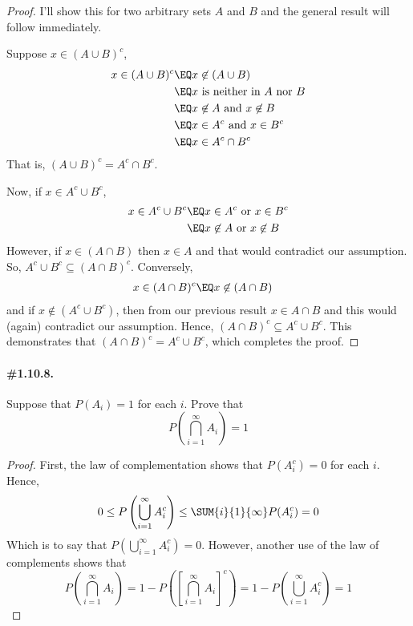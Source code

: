 \documentclass[12pt,titlepage]{article}
\begin{document}
\begin{proof}
I'll show this for two arbitrary sets $A$ and $B$ and the general result will follow immediately. 

Suppose $x \in (A \cup B)^{c}$, 
\begin{align*}
x \in (A \cup B)^{c} &\EQ x \not\in (A \cup B) \\
&\EQ \text{$x$ is neither in $A$ nor $B$} \\
&\EQ x \not\in A \text{ and } x \not\in B \\
&\EQ x \in A^{c} \text{ and } x \in B^{c} \\
&\EQ x \in A^{c} \cap B^{c}
\end{align*}
That is, $(A \cup B)^{c} = A^{c} \cap B^{c}$. 

Now, if $x \in A^{c} \cup B^{c}$, 
\begin{align*}
x \in A^{c} \cup B^{c} &\EQ x \in A^{c} \text{ or } x \in B^{c} \\
&\EQ x \not\in A \text{ or } x \not\in B
\end{align*}
However, if $x \in (A \cap B)$ then $x \in A$ and that would contradict our assumption. So, $A^{c} \cup B^{c} \subseteq (A \cap B)^{c}$. Conversely, 
\begin{align*}
x \in (A \cap B)^{c} &\EQ x \not\in (A \cap B)
\end{align*}
and if $x \not\in (A^{c} \cup B^{c})$, then from our previous result $x \in A \cap B$ and this would (again) contradict our assumption. Hence, $ (A \cap B)^{c} \subseteq A^{c} \cup B^{c}$. This demonstrates that $(A \cap B)^{c} = A^{c} \cup B^{c}$, which completes the proof.
\end{proof}

\paragraph{\#1.10.8.} Suppose that $P(A_i)=1$ for each $i$. Prove that
\[
P\left( \bigcap_{i=1}^{\infty} A_i \right) = 1
\]

\begin{proof}
First, the law of complementation shows that $P(A_i^{c}) = 0$ for each $i$. Hence, 
\[
0 \leq P\left( \bigcup_{i=1}^{\infty} A_i^{c} \right) \leq \SUM{i}{1}{\infty} P(A_{i}^{c}) = 0
\]
Which is to say that $P\left(\bigcup_{i=1}^{\infty} A_{i}^{c} \right) = 0$. However, another use of the law of complements shows that
\[
P\left(\bigcap_{i=1}^{\infty} A_{i}\right) = 1 - P\left(\left[ \bigcap_{i=1}^{\infty} A_i \right]^{c} \right) = 1 - P\left( \bigcup_{i=1}^{\infty} A_i^{c}  \right) = 1
\]
\end{proof}
\end{document}
